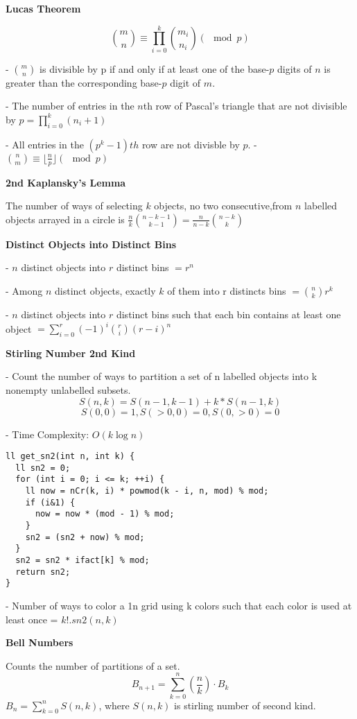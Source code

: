 \textbf{Lucas Theorem}

\[ \binom{m}{n} \equiv \prod_{i = 0}^k \binom{m_i}{n_i} (\mod p) \]

- \( \binom{m}{n} \) is divisible by p if and only if at least one of the base-\(p\) digits of \( n \) is greater than the corresponding base-\( p \) digit of \( m \).

- The number of entries in the \( n \)th row of Pascal's triangle that are not divisible by \( p  = \prod_{i = 0}^k (n_i + 1) \)

- All entries in the \( (p^{k} - 1)th \) row are not divisble by \( p \).
- \( \binom{n}{m} \equiv \lfloor \frac{n}{p} \rfloor (\mod p) \)

\textbf{2nd Kaplansky's Lemma}

The number of ways of selecting \( k \) objects, no two consecutive,from \( n \) labelled objects arrayed in a circle is \( \frac{n}{k} \binom{n-k-1}{k-1} = \frac{n}{n - k} \binom{n-k}{k} \)

\textbf{Distinct Objects into Distinct Bins}

- $ n $ distinct objects into $ r $ distinct bins $ = r^n $

- Among $ n $ distinct objects, exactly $ k $ of them into r distincts bins $ = \binom{n}{k}r^k $

- $ n $ distinct objects into $ r $ distinct bins such that each bin contains at least one object $ = \sum_{i = 0}^{r} (-1)^i \binom{r}{i} (r - i)^n $

\textbf{Stirling Number 2nd Kind}

- Count the number of ways to partition a set of n labelled objects into k nonempty unlabelled subsets.
\[ S(n, k) = S(n-1, k-1) + k * S(n-1, k) \]
\[ S(0, 0) = 1, S(>0, 0) = 0, S(0, >0) = 0 \]

- Time Complexity: $ O(k\log n) $
\begin{verbatim}
ll get_sn2(int n, int k) {
  ll sn2 = 0;
  for (int i = 0; i <= k; ++i) {
    ll now = nCr(k, i) * powmod(k - i, n, mod) % mod;
    if (i&1) {
      now = now * (mod - 1) % mod;
    }
    sn2 = (sn2 + now) % mod;
  }
  sn2 = sn2 * ifact[k] % mod;
  return sn2;
}
\end{verbatim}
- Number of ways to color a 1\*n grid using k colors such that each color is used at least once = \( k! . sn2(n,k) \)

\textbf{Bell Numbers}

Counts the number of partitions of a set.
\begin{equation}
B_{n+1}=\sum_{k=0}^n\left(\frac{n}{k}\right) \cdot B_k
\end{equation}
$B_n=\sum_{k=0}^n S(n, k)$, where $S(n, k)$ is stirling number of second kind.

